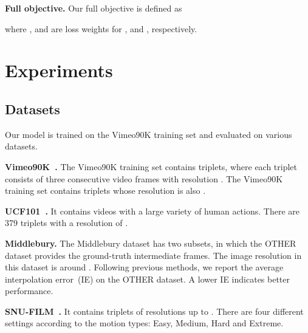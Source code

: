 \documentclass[10pt,twocolumn,letterpaper]{article}
\begin{document}
\vspace{0.05in}	
	\noindent\textbf{Full objective.} Our full objective is defined as
	
	where ,  and  are loss weights for ,  and , respectively.
	
\section{Experiments}
	
	\subsection{Datasets}
	
	Our model is trained on the Vimeo90K training set and evaluated on various datasets.

	\vspace{0.05in}	
	\noindent\textbf{Vimeo90K~\cite{vimeo90k}.} The Vimeo90K training set contains  triplets, where each triplet consists of three consecutive video frames with resolution . The Vimeo90K training set contains  triplets whose resolution is also .

	\vspace{0.05in}	
	\noindent\textbf{UCF101~\cite{ucf101}.} It contains videos with a large variety of human actions. There are 379 triplets with a resolution of .

	\vspace{0.05in}	
	\noindent\textbf{Middlebury.} The Middlebury dataset has two subsets, in which the OTHER dataset provides the ground-truth intermediate frames. The image resolution in this dataset is around . Following previous methods, we report the average interpolation error~(IE) on the OTHER dataset. A lower IE indicates better performance.
	
	
\vspace{0.05in}	
	\noindent\textbf{SNU-FILM~\cite{snufilm}.} It contains  triplets of resolutions up to . There are four different settings according to the motion types: Easy, Medium, Hard and Extreme.
	
\end{document}
